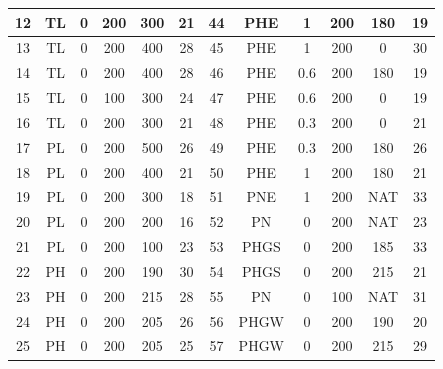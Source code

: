 \begin{table}[p]
\begin{center}
\begin{tabular}{|c|c|c|c|c|c||c|c|c|c|c|c|}
12   & TL      & 0     & 200        & 300       & 21          &   44   & PHE     & 1     & 200        & 180       & 19          \\ \hline              
13   & TL      & 0     & 200        & 400       & 28          &   45   & PHE     & 1     & 200        & 0         & 30          \\ \hline              
14   & TL      & 0     & 200        & 400       & 28          &   46   & PHE     & 0.6   & 200        & 180       & 19          \\ \hline              
15   & TL      & 0     & 100        & 300       & 24          &   47   & PHE     & 0.6   & 200        & 0         & 19          \\ \hline              
16   & TL      & 0     & 200        & 300       & 21          &   48   & PHE     & 0.3   & 200        & 0         & 21          \\ \hline              
17   & PL      & 0     & 200        & 500       & 26          &   49   & PHE     & 0.3   & 200        & 180       & 26          \\ \hline              
18   & PL      & 0     & 200        & 400       & 21          &   50   & PHE     & 1     & 200        & 180       & 21          \\ \hline              
19   & PL      & 0     & 200        & 300       & 18          &   51   & PNE     & 1     & 200        & NAT       & 33          \\ \hline              
20   & PL      & 0     & 200        & 200       & 16          &   52   & PN      & 0     & 200        & NAT       & 23          \\ \hline              
21   & PL      & 0     & 200        & 100       & 23          &   53   & PHGS    & 0     & 200        & 185       & 33          \\ \hline              
22   & PH      & 0     & 200        & 190       & 30          &   54   & PHGS    & 0     & 200        & 215       & 21          \\ \hline              
23   & PH      & 0     & 200        & 215       & 28          &   55   & PN      & 0     & 100        & NAT       & 31          \\ \hline              
24   & PH      & 0     & 200        & 205       & 26          &   56   & PHGW    & 0     & 200        & 190       & 20          \\ \hline              
25   & PH      & 0     & 200        & 205       & 25          &   57   & PHGW    & 0     & 200        & 215       & 29          \\ \hline              

\end{tabular}
\end{center}
\end{table}
